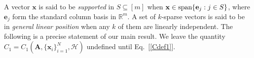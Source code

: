 \documentclass[9pt,twocolumn]{pnas-new}
\renewcommand{\eqref}[1]{\textnormal{[\ref{#1}]}}
\begin{document}
A vector $\mathbf{x}$ is said to be \emph{supported} in $S \subseteq [m]$ when $\mathbf{x} \in \text{\rm span}\{\mathbf{e}_j: j\in S\}$, where $\mathbf{e}_j$ form the standard column basis in $\mathbb R^m$. 
A set of $k$-sparse vectors is said to be in \emph{general linear position} when any $k$ of them are linearly independent. The following is a precise statement of our main result.  We leave the quantity $C_1 = C_1(\mathbf{A}, \{\mathbf{x}_i\}_{i=1}^N, \mathcal{H})$ undefined until Eq.~\eqref{Cdef1}.

\end{document}
